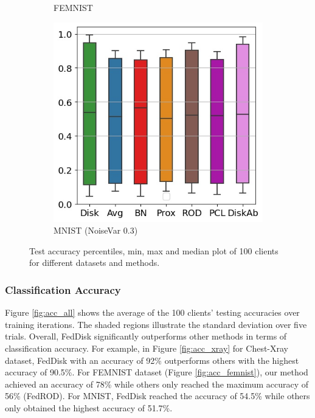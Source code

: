 \documentclass[journal]{IEEEtai}
\newcommand{\MethodnameShort}{FedDisk}
\newcommand\parties{100}
\begin{document}
\begin{figure}[ht!]
\begin{subfigure}[t]{0.3\linewidth}
		\caption{FEMNIST}
		\label{fig:cl_acc_femnist}
	\end{subfigure}
	\hspace{0.01em}%
	\begin{subfigure}[t]{0.3\linewidth}	
		\includegraphics[width=\linewidth]{Figures/mnist/ClientAcc}
		\caption{MNIST (NoiseVar 0.3) }
		\label{fig:cl_acc_mnist}
	\end{subfigure}
	\caption{Test accuracy percentiles, min, max and median plot of \parties{} clients for different datasets and methods. }
	\label{fig:cl_acc_all}
\end{figure}

\subsubsection{Classification Accuracy} Figure \ref{fig:acc_all} shows the average of the \parties{} clients' testing accuracies over training iterations. The shaded regions illustrate the standard deviation over five trials. Overall, \MethodnameShort{} significantly outperforms other methods in terms of classification accuracy. For example, in Figure \ref{fig:acc_xray} for Chest-Xray dataset, \MethodnameShort{} with an accuracy of 92\% outperforms others with the highest accuracy of 90.5\%. For FEMNIST dataset (Figure \ref{fig:acc_femnist}), our method achieved an accuracy of 78\% while others only reached the maximum accuracy of 56\% (FedROD). For MNIST, \MethodnameShort{} reached the accuracy of 54.5\% while others only obtained the highest accuracy of 51.7\%. 
\end{document}
